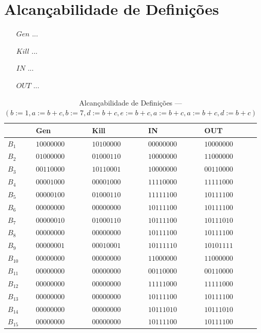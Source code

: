 \section{Alcan\c{c}abilidade de Defini\c{c}\~oes}

\begin{itemize}
  \item[$Gen$] ...
  \item[$Kill$] ...
  \item[$IN$] ...
  \item[$OUT$] ...
\end{itemize}

\begin{table}[ht]
\centering
\begin{tabular}{l|l|l|l|l}
	& Gen & Kill & IN & OUT\\
\hline
$B_{1}$ &  $10000000$ & $10100000$ & $00000000$ & $10000000$\\
$B_{2}$ &  $01000000$ & $01000110$ & $10000000$ & $11000000$\\
$B_{3}$ &  $00110000$ & $10110001$ & $10000000$ & $00110000$\\
$B_{4}$ &  $00001000$ & $00001000$ & $11110000$ & $11111000$\\
$B_{5}$ &  $00000100$ & $01000110$ & $11111100$ & $10111100$\\
$B_{6}$ &  $00000000$ & $00000000$ & $10111100$ & $10111100$\\
$B_{7}$ &  $00000010$ & $01000110$ & $10111100$ & $10111010$\\
$B_{8}$ &  $00000000$ & $00000000$ & $10111100$ & $10111100$\\
$B_{9}$ &  $00000001$ & $00010001$ & $10111110$ & $10101111$\\
$B_{10}$ &  $00000000$ & $00000000$ & $11000000$ & $11000000$\\
$B_{11}$ &  $00000000$ & $00000000$ & $00110000$ & $00110000$\\
$B_{12}$ &  $00000000$ & $00000000$ & $11111000$ & $11111000$\\
$B_{13}$ &  $00000000$ & $00000000$ & $10111100$ & $10111100$\\
$B_{14}$ &  $00000000$ & $00000000$ & $10111010$ & $10111010$\\
$B_{15}$ &  $00000000$ & $00000000$ & $10111100$ & $10111100$\\
\end{tabular}
\caption{Alcan\c{c}abilidade de Defini\c{c}\~oes --- $(b:=1, a:=b+c, b:=7, d:=b+c, e:=b+c, a:=b+c, a:=b+c, d:=b+c)$}
\end{table}

